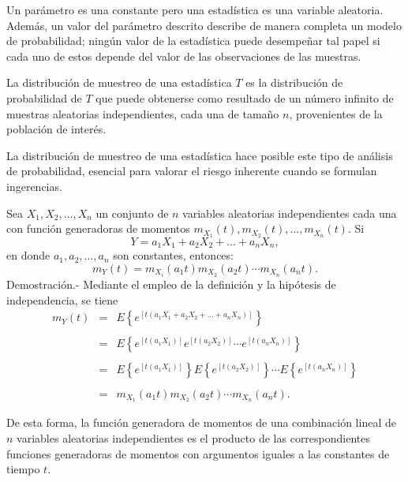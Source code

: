 Un parámetro es una constante pero una estadística es una variable aleatoria. Además, un valor del parámetro descrito describe de manera completa un modelo de probabilidad; ningún valor de la estadística puede desempeñar tal papel si cada uno de estos depende del valor de las observaciones de las muestras. 

\begin{def.}
    La distribución de muestreo de una estadística $T$ es la distribución de probabilidad de $T$ que puede obtenerse como resultado de un número infinito de muestras aleatorias independientes, cada una de tamaño $n$, provenientes de la población de interés.
\end{def.}

La distribución de muestreo de una estadística hace posible este tipo de análisis de probabilidad, esencial para valorar el riesgo inherente cuando se formulan ingerencias.

\begin{teo}
    Sea $X_1,X_2,\ldots, X_n$ un conjunto de $n$ variables aleatorias independientes cada una con función generadoras de momentos $m_{X_1}(t),m_{X_2}(t),\ldots , m_{X_n}(t).$
    Si 
    $$Y=a_1X_1+a_2X_2+\ldots + a_nX_n,$$
    en donde $a_1,a_2,\ldots,a_n$ son constantes, entonces:
    $$m_Y(t)=m_{X_i}(a_1t)m_{X_2}(a_2t)\cdots m_{X_n}(a_nt).$$
	Demostración.-\; Mediante el empleo de la definición y la hipótesis de independencia, se tiene
	$$\begin{array}{rcl}
	    m_Y(t)&=&E\left\{e^{\left[t\left(a_1X_1+a_2X_2+\ldots + a_nX_n\right)\right]}\right\}\\\\
		  &=&E\left\{e^{\left[t\left(a_1X_1\right)\right]}e^{\left[t\left(a_2X_2\right)\right]}\cdots e^{\left[t\left(a_nX_n\right)\right]}\right\}\\\\
		  &=&E\left\{e^{\left[t\left(a_1X_1\right)\right]}\right\}E\left\{e^{\left[t\left(a_2X_2\right)\right]}\right\}\cdots E\left\{e^{\left[t\left(a_nX_n\right)\right]}\right\}\\\\
		  &=&m_{X_1}(a_1t)m_{X_2}(a_2t)\cdots m_{X_n}(a_nt).
	\end{array}$$
\end{teo}

De esta forma, la función generadora de momentos de una combinación lineal de $n$ variables aleatorias independientes es el producto de las correspondientes funciones generadoras de momentos con argumentos iguales a las constantes de tiempo $t$.

